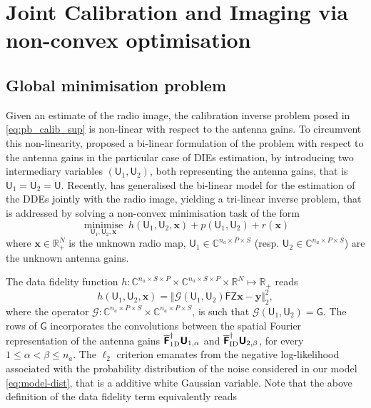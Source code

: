 \documentclass[fleqn,usenatbib]{mnras}
\newcommand{\xb}{\ensuremath{\boldsymbol{x}}}
\newcommand{\yb}{\ensuremath{\boldsymbol{y}}}
\newcommand{\Fb}{\ensuremath{\boldsymbol{\mathsf{F}}}}
\newcommand{\Gb}{\ensuremath{\boldsymbol{\mathsf{G}}}}
\newcommand{\Ub}{\ensuremath{\boldsymbol{\mathsf{U}}}}
\newcommand{\Zb}{\ensuremath{\boldsymbol{\mathsf{Z}}}}
\newcommand{\Gc}{\ensuremath{\mathcal{G}}}
\newcommand{\eC}{\mathbb{C}}
\newcommand{\eR}{\mathbb{R}}
\begin{document}
\section{Joint Calibration and Imaging via non-convex optimisation}\label{sec:JCI}
\subsection{Global minimisation problem }\label{ssec:globalmin}
Given an estimate of the radio image, the calibration inverse problem posed in \eqref{eq:pb_calib_sup} is non-linear with respect to the antenna gains. To circumvent this non-linearity, \citet{Salvini2014} proposed a bi-linear formulation of the problem with respect to the antenna gains in the particular case of DIEs estimation, by introducing two intermediary variables $\left( {\Ub}_1,{\Ub}_2 \right)$, both representing the antenna gains, that is ${\Ub}_1 ={\Ub}_2 ={\Ub}$. Recently, \citet{Repetti2017} has generalised the bi-linear model for the estimation of the DDEs jointly with the radio image, {yielding a tri-linear inverse problem, that is addressed by} solving a non-convex minimisation task of the form
\begin{equation} 
 \label{eq:min-gen-th}
 \underset{\Ub_1,\Ub_2, \xb}{\operatorname{minimise}} \;
 {h}(\Ub_1,\Ub_{2}, \xb) + p(\Ub_1,\Ub_{2})+ r(\xb)
\end{equation}
where $\xb\in\eR^N_{+}$ is the unknown radio map, $\Ub_1\in\eC^{n_a \times P\times S}$ (resp. $\Ub_2\in\eC^{n_a \times P\times S}$) are the unknown antenna gains. 

The data fidelity function $h:\eC^{n_a \times S \times P}\times \eC^{n_a \times S \times P}\times \eR^N\mapsto \eR_+$ reads
\begin{equation}
 	{h}(\Ub_1,\Ub_{2}, \xb)= \Vert \Gc \left( \Ub_1,\Ub_2\right) {\Fb\Zb} \xb - \yb \Vert^2_2, 
\label{eq:data_fid_im}	
\end{equation}
where the operator $\Gc:\eC^{n_a \times P \times S}\times \eC^{n_a \times P \times S} $, is such that $\Gc\left( \Ub_1,\Ub_2\right)=\Gb$. The rows of $\Gb$ incorporates the convolutions between the spatial Fourier representation of the antenna gains $\overline{\Fb}_{\rm{1D}}^{\dagger}{\Ub}_{1,\alpha}$ and $ \overline{\Fb}_{\rm {ID}}^{\dagger}{\Ub}_{2,\beta}$, for every $ 1\leq \alpha< \beta \leq n_a$. 
{The $\ell_2$ criterion emanates from the negative log-likelihood associated with the probability distribution of the noise considered in our model \eqref{eq:model-dist}, that is a additive white Gaussian variable}. Note that the above definition of the data fidelity term equivalently reads 
\end{document}
